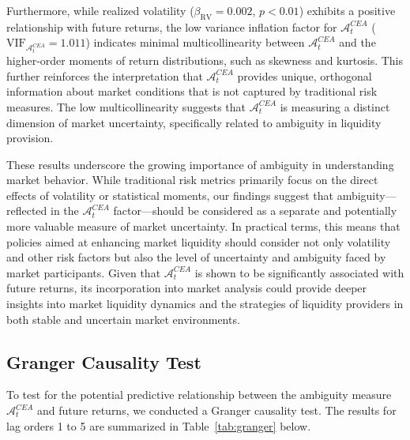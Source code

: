 \documentclass[preprint,12pt,authoryear]{elsarticle}
\begin{document}
Furthermore, while realized volatility (\(\beta_{\mathrm{RV}} = 0.002\), \(p < 0.01\)) exhibits a positive relationship with future returns, the low variance inflation factor for $\mathcal{A}^{CEA}_t$ (\(\mathrm{VIF}_{\mathcal{A}^{CEA}_t} = 1.011\)) indicates minimal multicollinearity between $\mathcal{A}^{CEA}_t$ and the higher-order moments of return distributions, such as skewness and kurtosis. This further reinforces the interpretation that $\mathcal{A}^{CEA}_t$ provides unique, orthogonal information about market conditions that is not captured by traditional risk measures. The low multicollinearity suggests that $\mathcal{A}^{CEA}_t$ is measuring a distinct dimension of market uncertainty, specifically related to ambiguity in liquidity provision.

These results underscore the growing importance of ambiguity in understanding market behavior. While traditional risk metrics primarily focus on the direct effects of volatility or statistical moments, our findings suggest that ambiguity—reflected in the $\mathcal{A}^{CEA}_t$ factor—should be considered as a separate and potentially more valuable measure of market uncertainty. In practical terms, this means that policies aimed at enhancing market liquidity should consider not only volatility and other risk factors but also the level of uncertainty and ambiguity faced by market participants. Given that $\mathcal{A}^{CEA}_t$ is shown to be significantly associated with future returns, its incorporation into market analysis could provide deeper insights into market liquidity dynamics and the strategies of liquidity providers in both stable and uncertain market environments.

\subsection{Granger Causality Test}
To test for the potential predictive relationship between the ambiguity measure $ \mathcal{A}^{CEA}_t $ and future returns, we conducted a Granger causality test. The results for lag orders 1 to 5 are summarized in Table~\ref{tab:granger} below.
\end{document}
